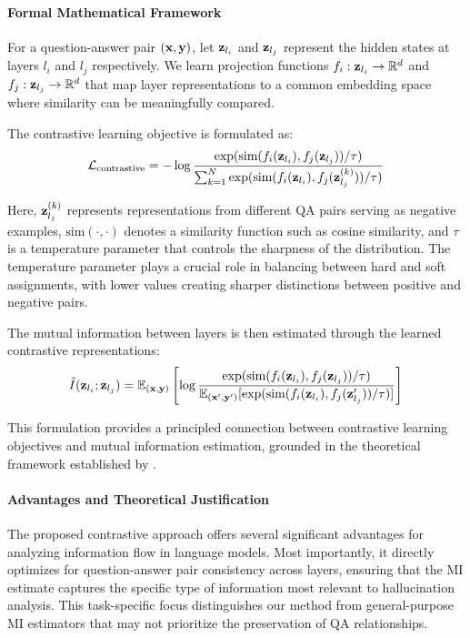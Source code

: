 \paragraph{Formal Mathematical Framework}

For a question-answer pair $({\mathbf{x}}, {\mathbf{y}})$, let ${\mathbf{z}}_{l_i}$ and ${\mathbf{z}}_{l_j}$ represent the hidden states at layers $l_i$ and $l_j$ respectively. We learn projection functions $f_i: {\mathbf{z}}_{l_i} \rightarrow \mathbb{R}^d$ and $f_j: {\mathbf{z}}_{l_j} \rightarrow \mathbb{R}^d$ that map layer representations to a common embedding space where similarity can be meaningfully compared.

The contrastive learning objective is formulated as:
\[
\mathcal{L}_{\text{contrastive}} = -\log \frac{\exp(\text{sim}(f_i({\mathbf{z}}_{l_i}), f_j({\mathbf{z}}_{l_j})) / \tau)}{\sum_{k=1}^{N} \exp(\text{sim}(f_i({\mathbf{z}}_{l_i}), f_j({\mathbf{z}}_{l_j}^{(k)})) / \tau)}
\]

Here, ${\mathbf{z}}_{l_j}^{(k)}$ represents representations from different QA pairs serving as negative examples, $\text{sim}(\cdot, \cdot)$ denotes a similarity function such as cosine similarity, and $\tau$ is a temperature parameter that controls the sharpness of the distribution. The temperature parameter plays a crucial role in balancing between hard and soft assignments, with lower values creating sharper distinctions between positive and negative pairs.

The mutual information between layers is then estimated through the learned contrastive representations:
\[
\hat{I}({\mathbf{z}}_{l_i}; {\mathbf{z}}_{l_j}) = \mathbb{E}_{({\mathbf{x}},{\mathbf{y}})} \left[ \log \frac{\exp(\text{sim}(f_i({\mathbf{z}}_{l_i}), f_j({\mathbf{z}}_{l_j})) / \tau)}{\mathbb{E}_{({\mathbf{x}}',{\mathbf{y}}')} [\exp(\text{sim}(f_i({\mathbf{z}}_{l_i}), f_j({\mathbf{z}}_{l_j}')) / \tau)]} \right]
\]

This formulation provides a principled connection between contrastive learning objectives and mutual information estimation, grounded in the theoretical framework established by \citet{poole2019variational}.

\paragraph{Advantages and Theoretical Justification}

The proposed contrastive approach offers several significant advantages for analyzing information flow in language models. Most importantly, it directly optimizes for question-answer pair consistency across layers, ensuring that the MI estimate captures the specific type of information most relevant to hallucination analysis. This task-specific focus distinguishes our method from general-purpose MI estimators that may not prioritize the preservation of QA relationships.

